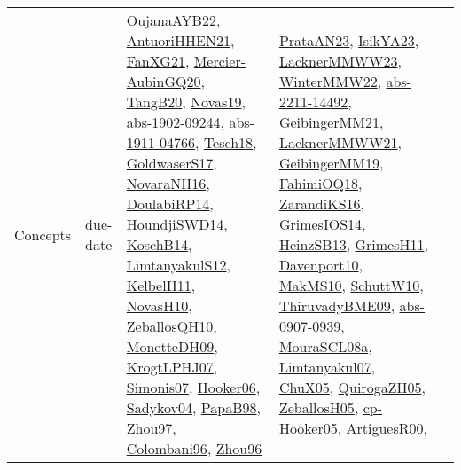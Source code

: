 {\begin{longtable}{lp{3cm}>{\raggedright}p{6cm}>{\raggedright}p{6cm}p{8cm}}
Concepts & due-date & \href{papers/OujanaAYB22.pdf}{OujanaAYB22}\cite{OujanaAYB22}, \href{papers/AntuoriHHEN21.pdf}{AntuoriHHEN21}\cite{AntuoriHHEN21}, \href{articles/FanXG21.pdf}{FanXG21}\cite{FanXG21}, \href{papers/Mercier-AubinGQ20.pdf}{Mercier-AubinGQ20}\cite{Mercier-AubinGQ20}, \href{papers/TangB20.pdf}{TangB20}\cite{TangB20}, \href{articles/Novas19.pdf}{Novas19}\cite{Novas19}, \href{articles/abs-1902-09244.pdf}{abs-1902-09244}\cite{abs-1902-09244}, \href{articles/abs-1911-04766.pdf}{abs-1911-04766}\cite{abs-1911-04766}, \href{papers/Tesch18.pdf}{Tesch18}\cite{Tesch18}, \href{papers/GoldwaserS17.pdf}{GoldwaserS17}\cite{GoldwaserS17}, \href{articles/NovaraNH16.pdf}{NovaraNH16}\cite{NovaraNH16}, \href{papers/DoulabiRP14.pdf}{DoulabiRP14}\cite{DoulabiRP14}, \href{papers/HoundjiSWD14.pdf}{HoundjiSWD14}\cite{HoundjiSWD14}, \href{papers/KoschB14.pdf}{KoschB14}\cite{KoschB14}, \href{articles/LimtanyakulS12.pdf}{LimtanyakulS12}\cite{LimtanyakulS12}, \href{articles/KelbelH11.pdf}{KelbelH11}\cite{KelbelH11}, \href{articles/NovasH10.pdf}{NovasH10}\cite{NovasH10}, \href{articles/ZeballosQH10.pdf}{ZeballosQH10}\cite{ZeballosQH10}, \href{papers/MonetteDH09.pdf}{MonetteDH09}\cite{MonetteDH09}, \href{papers/KrogtLPHJ07.pdf}{KrogtLPHJ07}\cite{KrogtLPHJ07}, \href{articles/Simonis07.pdf}{Simonis07}\cite{Simonis07}, \href{articles/Hooker06.pdf}{Hooker06}\cite{Hooker06}, \href{papers/Sadykov04.pdf}{Sadykov04}\cite{Sadykov04}, \href{articles/PapaB98.pdf}{PapaB98}\cite{PapaB98}, \href{articles/Zhou97.pdf}{Zhou97}\cite{Zhou97}, \href{papers/Colombani96.pdf}{Colombani96}\cite{Colombani96}, \href{papers/Zhou96.pdf}{Zhou96}\cite{Zhou96} & \href{articles/PrataAN23.pdf}{PrataAN23}\cite{PrataAN23}, \href{articles/IsikYA23.pdf}{IsikYA23}\cite{IsikYA23}, \href{articles/LacknerMMWW23.pdf}{LacknerMMWW23}\cite{LacknerMMWW23}, \href{papers/WinterMMW22.pdf}{WinterMMW22}\cite{WinterMMW22}, \href{articles/abs-2211-14492.pdf}{abs-2211-14492}\cite{abs-2211-14492}, \href{papers/GeibingerMM21.pdf}{GeibingerMM21}\cite{GeibingerMM21}, \href{papers/LacknerMMWW21.pdf}{LacknerMMWW21}\cite{LacknerMMWW21}, \href{papers/GeibingerMM19.pdf}{GeibingerMM19}\cite{GeibingerMM19}, \href{articles/FahimiOQ18.pdf}{FahimiOQ18}\cite{FahimiOQ18}, \href{articles/ZarandiKS16.pdf}{ZarandiKS16}\cite{ZarandiKS16}, \href{articles/GrimesIOS14.pdf}{GrimesIOS14}\cite{GrimesIOS14}, \href{articles/HeinzSB13.pdf}{HeinzSB13}\cite{HeinzSB13}, \href{papers/GrimesH11.pdf}{GrimesH11}\cite{GrimesH11}, \href{papers/Davenport10.pdf}{Davenport10}\cite{Davenport10}, \href{papers/MakMS10.pdf}{MakMS10}\cite{MakMS10}, \href{papers/SchuttW10.pdf}{SchuttW10}\cite{SchuttW10}, \href{papers/ThiruvadyBME09.pdf}{ThiruvadyBME09}\cite{ThiruvadyBME09}, \href{articles/abs-0907-0939.pdf}{abs-0907-0939}\cite{abs-0907-0939}, \href{papers/MouraSCL08a.pdf}{MouraSCL08a}\cite{MouraSCL08a}, \href{papers/Limtanyakul07.pdf}{Limtanyakul07}\cite{Limtanyakul07}, \href{papers/ChuX05.pdf}{ChuX05}\cite{ChuX05}, \href{papers/QuirogaZH05.pdf}{QuirogaZH05}\cite{QuirogaZH05}, \href{articles/ZeballosH05.pdf}{ZeballosH05}\cite{ZeballosH05}, \href{papers/cp-Hooker05.pdf}{cp-Hooker05}\cite{cp-Hooker05}, \href{articles/ArtiguesR00.pdf}{ArtiguesR00}\cite{ArtiguesR00}, 
\end{longtable}}

